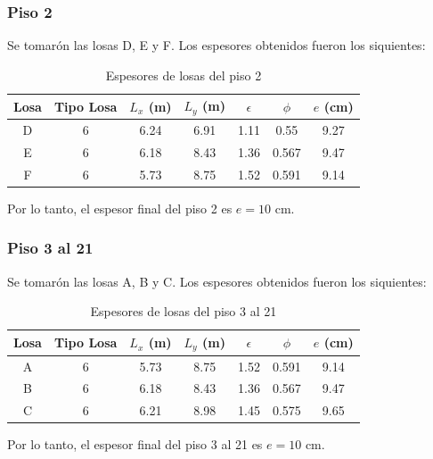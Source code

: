 \subsubsection{Piso 2}

Se tomarón las losas D, E y F. Los espesores obtenidos fueron los siquientes:

\begin{table}[H]
    \centering
    \begin{tabular}{|c|c|c|c|c|c|c|}
        \hline
        Losa & Tipo Losa & $L_x$ (m)& $L_y$ (m) & $\epsilon$ & $\phi$ & $e$ (cm) \\
        \hline
        D & 6 & 6.24 & 6.91 & 1.11 & 0.55 & 9.27 \\
        E & 6 & 6.18 & 8.43 & 1.36 & 0.567 & 9.47 \\
        F & 6 & 5.73 & 8.75 & 1.52 & 0.591 & 9.14 \\
        \hline
    \end{tabular}
    \caption{Espesores de losas del piso 2}
\end{table}

Por lo tanto, el espesor final del piso 2 es $e=10$ cm.

\subsubsection{Piso 3 al 21}

Se tomarón las losas A, B y C. Los espesores obtenidos fueron los siquientes:

\begin{table}[H]
    \centering
    \begin{tabular}{|c|c|c|c|c|c|c|}
        \hline
        Losa & Tipo Losa & $L_x$ (m)& $L_y$ (m) & $\epsilon$ & $\phi$ & $e$ (cm) \\
        \hline
        A & 6 & 5.73 & 8.75 & 1.52 & 0.591 & 9.14 \\
        B & 6 & 6.18 & 8.43 & 1.36 & 0.567 & 9.47 \\
        C & 6 & 6.21 & 8.98 & 1.45 & 0.575 & 9.65 \\
        \hline
    \end{tabular}
    \caption{Espesores de losas del piso 3 al 21}
\end{table}

Por lo tanto, el espesor final del piso 3 al 21 es $e=10$ cm.
